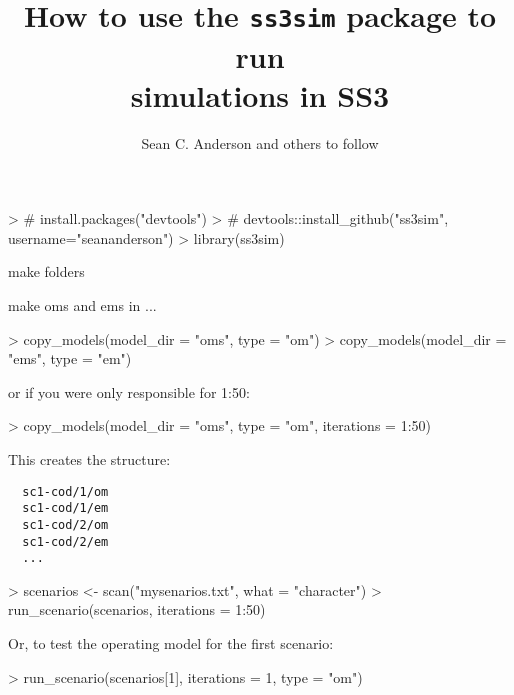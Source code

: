 \documentclass[12pt]{article}
\title{How to use the \texttt{ss3sim} package to run\\simulations in SS3}
\author{Sean C. Anderson and others to follow}
\date{}
\begin{document}
\maketitle

\noindent

\begin{Schunk}
\begin{Sinput}
> # install.packages("devtools")
> # devtools::install_github("ss3sim", username="seananderson")
> library(ss3sim)
\end{Sinput}
\end{Schunk}

\noindent
make folders

\noindent
make oms and ems in ...

\begin{Schunk}
\begin{Sinput}
> copy_models(model_dir = "oms", type = "om")
> copy_models(model_dir = "ems", type = "em")
\end{Sinput}
\end{Schunk}

\noindent
or if you were only responsible for 1:50:

\begin{Schunk}
\begin{Sinput}
> copy_models(model_dir = "oms", type = "om", iterations = 1:50)
\end{Sinput}
\end{Schunk}

\noindent
This creates the structure:

\begin{verbatim}
  sc1-cod/1/om
  sc1-cod/1/em
  sc1-cod/2/om
  sc1-cod/2/em
  ...
\end{verbatim}

\begin{Schunk}
\begin{Sinput}
> scenarios <- scan("mysenarios.txt", what = "character")
> run_scenario(scenarios, iterations = 1:50)
\end{Sinput}
\end{Schunk}

\noindent
Or, to test the operating model for the first scenario:

\begin{Schunk}
\begin{Sinput}
> run_scenario(scenarios[1], iterations = 1, type = "om")
\end{Sinput}
\end{Schunk}

%
\end{document}
